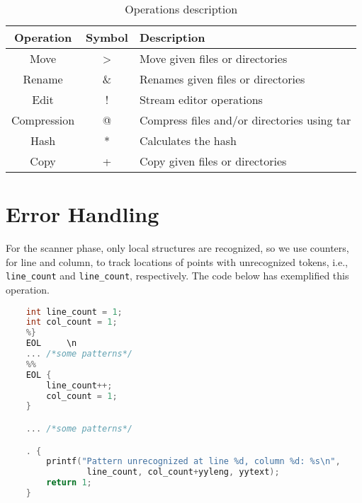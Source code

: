 \documentclass{article}
\begin{document}
\begin{table}[ht]
    \centering
    \caption{Operations description}
    \label{tab:operations}
    \begin{tabular}{|c|c|l|} \hline
        Operation   & Symbol & Description\\ \hline
        Move        & >      & Move given files or directories \\
        Rename      & \&     & Renames given files or directories \\
        Edit        & !      & Stream editor operations \\
        Compression & @      & Compress files and/or directories using tar \\
        Hash        & *     & Calculates the hash \\
        Copy        & +     & Copy given files or directories \\ \hline
    \end{tabular}
\end{table}


\section{Error Handling}
\label{sec:error}
For the scanner phase, only local structures are recognized, so we use counters,
for line and column, to track locations of points with unrecognized tokens,
i.e., \texttt{line_count} and \texttt{line_count}, respectively. The
code below has exemplified this operation.

\begin{lstlisting}[language=C, caption=Example of code monitoring lines and columns.]
    %{
    int line_count = 1;
    int col_count = 1;
    %}
    EOL     \n
    ... /*some patterns*/
    %%
    EOL {
        line_count++;
        col_count = 1;
    }

    ... /*some patterns*/

    . {
        printf("Pattern unrecognized at line %d, column %d: %s\n",
                line_count, col_count+yyleng, yytext);
        return 1;
    }
\end{lstlisting}
\end{document}
